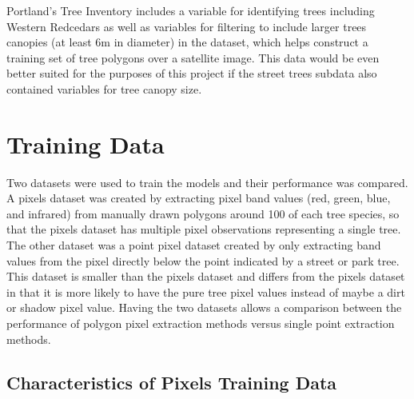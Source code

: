 \documentclass[12pt,twoside]{reedthesis}
\begin{document}
Portland's Tree Inventory includes a variable for identifying trees including Western Redcedars as well as variables for filtering to include larger trees canopies (at least 6m in diameter) in the dataset, which helps construct a training set of tree polygons over a satellite image. This data would be even better suited for the purposes of this project if the street trees subdata also contained variables for tree canopy size.

\hypertarget{training-data}{%
\section{Training Data}\label{training-data}}

Two datasets were used to train the models and their performance was compared. A pixels dataset was created by extracting pixel band values (red, green, blue, and infrared) from manually drawn polygons around 100 of each tree species, so that the pixels dataset has multiple pixel observations representing a single tree. The other dataset was a point pixel dataset created by only extracting band values from the pixel directly below the point indicated by a street or park tree. This dataset is smaller than the pixels dataset and differs from the pixels dataset in that it is more likely to have the pure tree pixel values instead of maybe a dirt or shadow pixel value. Having the two datasets allows a comparison between the performance of polygon pixel extraction methods versus single point extraction methods.

\hypertarget{characteristics-of-pixels-training-data}{%
\subsection{Characteristics of Pixels Training Data}\label{characteristics-of-pixels-training-data}}
\end{document}
